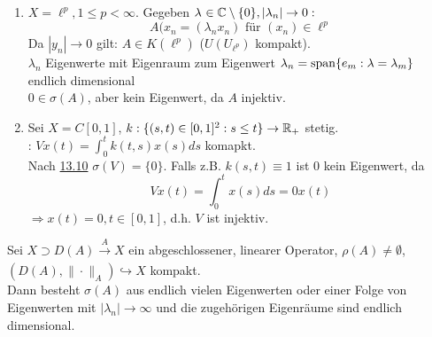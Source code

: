 \begin{beispiel}
	\begin{enumerate}[label=\alph*\upshape)]
		\item $X = \ell^{p}, 1 \leq p < \infty$. Gegeben $\lambda_{} \in \mathbb{C} \setminus \{ 0 \}, | \lambda_{n} | \rightarrow 0:$
			\[ A(x_{n} = (\lambda_{n} x_{n}) \text{ für } (x_{n}) \in \ell^{p} \]
			Da $| y_{n} | \rightarrow 0$ gilt: $A \in K(\ell^{p})$ ($U(U_{\ell^{p}})$ kompakt). \\
			$\lambda_{n}$ Eigenwerte mit Eigenraum zum Eigenwert $\lambda_{n} = \operatorname{span}\{ e_{m}: \lambda = \lambda_{m} \}$ endlich dimensional \\
			$0 \in \sigma(A)$, aber kein Eigenwert, da $A$ injektiv.
		\item Sei $X = C[0, 1]$, $k: \{ (s, t) \in [0, 1]^{2}: s \leq t \} \rightarrow \mathbb{R}_{+}$ stetig. \\
			: $V x(t) = \int_{0}^{t} k(t, s) x(s) ds$ komapkt. \\
			Nach \hyperref[bsp:13.10]{13.10} $\sigma(V) = \{ 0 \}$.
			Falls z.B. $k(s, t) \equiv 1$ ist $0$ kein Eigenwert, da 
			\[ V x(t) = \int_{0}^{t} x(s) ds = 0 x(t) \]
			$\Rightarrow x(t) = 0, t \in [0, 1]$, d.h. $V$ ist injektiv.
	\end{enumerate}	
\end{beispiel}


\begin{satz}
	Sei $X \supset D(A) \xrightarrow[]{A} X$ ein abgeschlossener, linearer Operator, $\rho(A) \neq \emptyset$, $(D(A), \| \cdot \|_{A}) \hookrightarrow X$ kompakt. \\
	Dann besteht $\sigma(A)$ aus endlich vielen Eigenwerten oder einer Folge von Eigenwerten mit $|\lambda_{n}| \rightarrow \infty$ und die zugehörigen Eigenräume sind endlich dimensional.
\end{satz}



\newpage